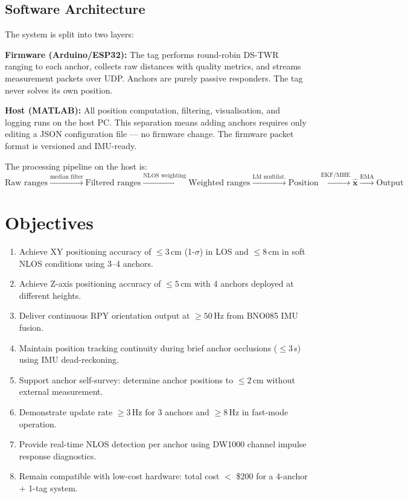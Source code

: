 \documentclass[11pt,a4paper]{article}
\newcommand{\vect}[1]{\bm{#1}}
\begin{document}
\subsection{Software Architecture}

The system is split into two layers:

\textbf{Firmware (Arduino/ESP32):} The tag performs round-robin DS-TWR ranging to each anchor, collects raw distances with quality metrics, and streams measurement packets over UDP. Anchors are purely passive responders. The tag never solves its own position.

\textbf{Host (MATLAB):} All position computation, filtering, visualisation, and logging runs on the host PC. This separation means adding anchors requires only editing a JSON configuration file — no firmware change. The firmware packet format is versioned and IMU-ready.

The processing pipeline on the host is:
\[
\text{Raw ranges} \xrightarrow{\text{median filter}} \text{Filtered ranges} \xrightarrow{\text{NLOS weighting}} \text{Weighted ranges} \xrightarrow{\text{LM multilat.}} \text{Position} \xrightarrow{\text{EKF/MHE}} \hat{\vect{x}} \xrightarrow{\text{EMA}} \text{Output}
\]

\section{Objectives}

\begin{enumerate}[leftmargin=2em, label=\textbf{O\arabic*.}]
  \item Achieve XY positioning accuracy of $\leq 3$\,cm (1-$\sigma$) in LOS and $\leq 8$\,cm in soft NLOS conditions using 3--4 anchors.
  \item Achieve Z-axis positioning accuracy of $\leq 5$\,cm with 4 anchors deployed at different heights.
  \item Deliver continuous RPY orientation output at $\geq 50$\,Hz from BNO085 IMU fusion.
  \item Maintain position tracking continuity during brief anchor occlusions ($\leq 3$\,s) using IMU dead-reckoning.
  \item Support anchor self-survey: determine anchor positions to $\leq 2$\,cm without external measurement.
  \item Demonstrate update rate $\geq 3$\,Hz for 3 anchors and $\geq 8$\,Hz in fast-mode operation.
  \item Provide real-time NLOS detection per anchor using DW1000 channel impulse response diagnostics.
  \item Remain compatible with low-cost hardware: total cost $<$ \$200 for a 4-anchor + 1-tag system.
\end{enumerate}
\end{document}
